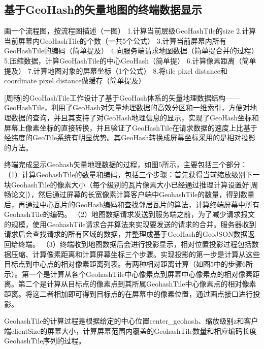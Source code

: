 \subsection{基于GeoHash的矢量地图的终端数据显示}
画一个流程图，按流程图描述（一图）
1.计算当前层级GeoHashTile的size
2.计算当前屏幕内GeoHashTile的个数（一共5个公式）
3.计算当前屏幕内所有GeoHashTile的编码（简单提及）
4.向服务端请求地图数据（简单提合并的过程）
5.压缩数据，计算GeoHashTile的中心GeoHash（简单提）
6.计算像素距离（简单提及）
7.计算地图对象的屏幕坐标（1个公式）
8.将tile pixel distance和coordinate pixel distance做缓存（简单提及）

[周畅]的GeoHashTile工作设计了基于GeoHash体系的矢量地理数据结构——GeoHashTile，利用了GeoHash对矢量地理数据的高效分区和一维索引，方便对地理数据的查询，并且其支持了对GeoHash地理信息的显示，实现了GeoHash坐标和屏幕上像素坐标的直接转换，并且验证了GeoHashTile在请求数据的速度上比基于经纬度的GeoTile系统有明显优势。其GeoHash转换成屏幕坐标采用的是相对投影的方法。

终端完成显示Geohash矢量地理数据的过程，如图5所示，主要包括三个部分：
（1）计算GeohashTile的数量和编码，包括三个步骤：首先获得当前缩放级别下一块GeohashTile的像素大小（每个级别的瓦片像素大小已经通过推理计算设置好[周畅论文]），然后通过屏幕的长宽像素计算客户端中GeohashTile的数量，得到数量后，再通过中心瓦片的GeoHash编码和查找邻居瓦片的算法，计算终端屏幕中所有GeohashTile的编码。
（2）地图数据请求发送到服务端之前，为了减少请求报文的规模，使用GeohashTile请求合并算法来实现要发送的请求的合并。服务器收到请求后会查找请求的所有区域的数据，并整理成基于GeoHash的GeoJSON数据返回给终端。
（3）终端收到地图数据后会进行投影显示，相对位置投影过程包括数据压缩、计算像素距离和计算屏幕坐标三个步骤。实现投影的第一步是计算从这些目标点到中心点的相对像素距离列表。有两种相对距离计算（如图5中的步骤6所示）。第一个是计算从各个GeohashTile中心像素点到屏幕中心像素点的相对像素距离。第二个是计算从目标点的像素点到其所属GeohashTile中心像素点的相对像素距离。将这二者相加即可得到目标点的在屏幕中的像素位置，通过画点接口进行投影。

GeohashTile的计算过程是根据给定的中心位置center_geohash、缩放级别z和客户端clientSize的屏幕大小，计算屏幕范围内覆盖的GeohashTile数量和相应编码长度GeohashTile序列的过程。

